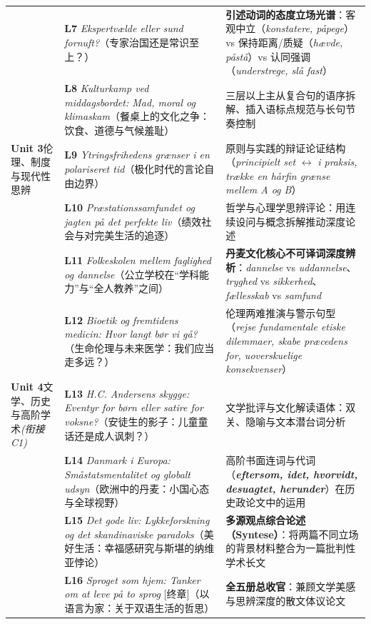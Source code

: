\documentclass[10.5pt, a4paper]{ctexart}
\begin{document}
{\begin{longtable}{@{} >{\raggedright\arraybackslash}p{2.65cm} >{\raggedright\arraybackslash}p{5.7cm} >{\raggedright\arraybackslash}p{7.25cm} @{}}
 & \textbf{L7} \textit{Ekspertvælde eller sund fornuft?}（专家治国还是常识至上？） & \textbf{引述动词的态度立场光谱}：客观中立（\textit{konstatere, påpege}）vs 保持距离/质疑（\textit{hævde, påstå}）vs 认同强调（\textit{understrege, slå fast}） \\
 & \textbf{L8} \textit{Kulturkamp ved middagsbordet: Mad, moral og klimaskam}（餐桌上的文化之争：饮食、道德与气候羞耻） & 三层以上主从复合句的语序拆解、插入语标点规范与长句节奏控制 \\
\midrule
\textbf{Unit 3}\newline 伦理、制度与\newline 现代性思辨 & \textbf{L9} \textit{Ytringsfrihedens grænser i en polariseret tid}（极化时代的言论自由边界） & 原则与实践的辩证论证结构（\textit{principielt set} $\leftrightarrow$ \textit{i praksis, trække en hårfin grænse mellem A og B}） \\
 & \textbf{L10} \textit{Præstationssamfundet og jagten på det perfekte liv}（绩效社会与对完美生活的追逐） & 哲学与心理学思辨评论：用连续设问与概念拆解推动深度论述 \\
 & \textbf{L11} \textit{Folkeskolen mellem faglighed og dannelse}（公立学校在“学科能力”与“全人教养”之间） & \textbf{丹麦文化核心不可译词深度辨析}：\textit{dannelse} vs \textit{uddannelse}、\textit{tryghed} vs \textit{sikkerhed}、\textit{fællesskab} vs \textit{samfund} \\
 & \textbf{L12} \textit{Bioetik og fremtidens medicin: Hvor langt bør vi gå?}（生命伦理与未来医学：我们应当走多远？） & 伦理两难推演与警示句型（\textit{rejse fundamentale etiske dilemmaer, skabe præcedens for, uoverskuelige konsekvenser}） \\
\midrule
\textbf{Unit 4}\newline 文学、历史与\newline 高阶学术\newline \textit{(衔接 C1)} & \textbf{L13} \textit{H.C. Andersens skygge: Eventyr for børn eller satire for voksne?}（安徒生的影子：儿童童话还是成人讽刺？） & 文学批评与文化解读语体：双关、隐喻与文本潜台词分析 \\
 & \textbf{L14} \textit{Danmark i Europa: Småstatsmentalitet og globalt udsyn}（欧洲中的丹麦：小国心态与全球视野） & 高阶书面连词与代词（\textbf{\textit{eftersom, idet, hvorvidt, desuagtet, herunder}}）在历史政论文中的运用 \\
 & \textbf{L15} \textit{Det gode liv: Lykkeforskning og det skandinaviske paradoks}（美好生活：幸福感研究与斯堪的纳维亚悖论） & \textbf{多源观点综合论述（Syntese）}：将两篇不同立场的背景材料整合为一篇批判性学术长文 \\
 & \textbf{L16} \textit{Sproget som hjem: Tanker om at leve på to sprog} [终章]（以语言为家：关于双语生活的哲思） & \textbf{全五册总收官}：兼顾文学美感与思辨深度的散文体议论文 \\
\end{longtable}
}
\end{document}
